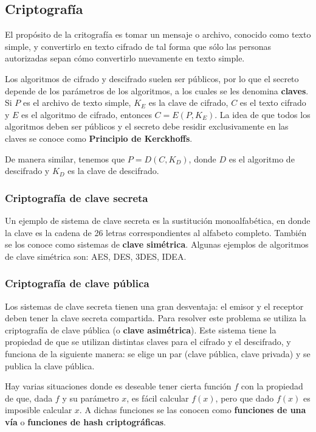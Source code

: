 \subsection{Criptografía}

El propósito de la critografía es tomar un mensaje o archivo, conocido como texto simple, y convertirlo en texto cifrado de tal forma que sólo las personas autorizadas sepan cómo convertirlo nuevamente en texto simple.

Los algoritmos de cifrado y descifrado suelen ser públicos, por lo que el secreto depende de los parámetros de los algoritmos, a los cuales se les denomina \textbf{claves}. Si $P$ es el archivo de texto simple, $K_{E}$ es la clave de cifrado, $C$ es el texto cifrado y $E$ es el algoritmo de cifrado, entonces $C = E(P, K_{E})$. La idea de que todos los algoritmos deben ser públicos y el secreto debe residir exclusivamente en las claves se conoce como \textbf{Principio de Kerckhoffs}.

De manera similar, tenemos que $P = D(C, K_{D})$, donde $D$ es el algoritmo de descifrado y $K_{D}$ es la clave de descifrado.

\subsubsection{Criptografía de clave secreta}

Un ejemplo de sistema de clave secreta es la sustitución monoalfabética, en donde la clave es la cadena de 26 letras correspondientes al alfabeto completo. También se los conoce como sistemas de \textbf{clave simétrica}. Algunas ejemplos de algoritmos de clave simétrica son: AES, DES, 3DES, IDEA.

\subsubsection{Criptografía de clave pública}

Los sistemas de clave secreta tienen una gran desventaja: el emisor y el receptor deben tener la clave secreta compartida. Para resolver este problema se utiliza la criptografía de clave pública (o \textbf{clave asimétrica}). Este sistema tiene la propiedad de que se utilizan distintas claves para el cifrado y el descifrado, y funciona de la siguiente manera: se elige un par (clave pública, clave privada) y se publica la clave pública.

Hay varias situaciones donde es deseable tener cierta función $f$ con la propiedad de que, dada $f$ y su parámetro $x$, es fácil calcular $f(x)$, pero que dado $f(x)$ es imposible calcular $x$. A dichas funciones se las conocen como \textbf{funciones de una vía} o \textbf{funciones de hash criptográficas}.


